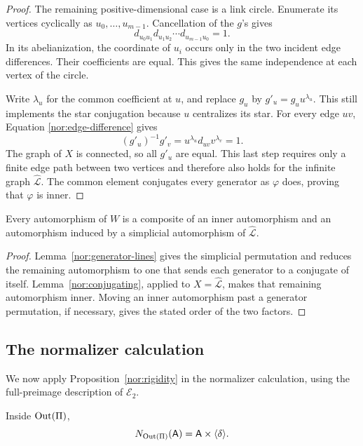 \begin{proof}
The remaining positive-dimensional case is a link circle.
Enumerate its vertices cyclically as
$u_0,\ldots,u_{m-1}$.  Cancellation of the $g$'s gives
\[
 d_{u_0u_1}d_{u_1u_2}\cdots d_{u_{m-1}u_0}=1.
\]
In its abelianization, the coordinate of $u_i$ occurs only
in the two incident edge differences.  Their coefficients
are equal.  This gives the same independence at each vertex
of the circle.

Write $\lambda_u$ for the common coefficient at $u$, and
replace $g_u$ by $g'_u=g_u u^{\lambda_u}$.  This still
implements the star conjugation because $u$ centralizes its
star.  For every edge $uv$, Equation
\eqref{nor:edge-difference} gives
\[
 (g'_u)^{-1}g'_v
   =u^{\lambda_u}d_{uv}v^{\lambda_v}=1.
\]
The graph of $X$ is connected, so all $g'_u$ are equal.
This last step requires only a finite edge path between two
vertices and therefore also holds for the infinite graph
$\widehat{\mathcal L}$.  The common element conjugates every
generator as $\varphi$ does, proving that $\varphi$ is inner.
\end{proof}

\begin{proposition}\label{nor:rigidity}
Every automorphism of $W$ is a composite of an inner
automorphism and an automorphism induced by a simplicial
automorphism of $\widehat{\mathcal L}$.
\end{proposition}

\begin{proof}
Lemma~\ref{nor:generator-lines} gives the simplicial
permutation and reduces the remaining automorphism to one
that sends each generator to a conjugate of itself.
Lemma~\ref{nor:conjugating}, applied to
$X=\widehat{\mathcal L}$, makes that remaining automorphism
inner.  Moving an inner automorphism past a generator
permutation, if necessary, gives the stated order of the
two factors.
\end{proof}

\subsection{The normalizer calculation}

We now apply Proposition~\ref{nor:rigidity} in the normalizer
calculation, using the full-preimage description of $\mathcal E_2$.

\begin{proposition}\label{nor:normalizer}
Inside $\operatorname{Out}(\Pi)$,
\begin{equation}\label{nor:normalizer-equality}
 N_{\operatorname{Out}(\Pi)}(\mathsf A)
   =\mathsf A\times\langle\delta\rangle.
\end{equation}
\end{proposition}

